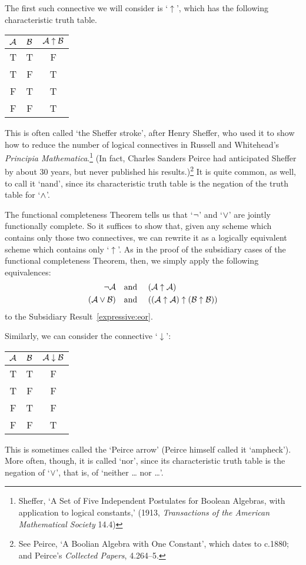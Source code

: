 The first such connective we will consider is `$\uparrow$', which has the following characteristic truth table. 
\begin{center}
\begin{tabular}{c c | c}
$\mathcal{A}$ & $\mathcal{B}$ & $\mathcal{A} \mathrel{\uparrow} \mathcal{B}$\\
\hline
 T & T & F \\
 T & F & T \\
 F & T & T  \\
 F & F & T
\end{tabular}
\end{center}
 This is often called `the Sheffer stroke', after Henry Sheffer, who used it to show how to reduce the number of logical connectives in Russell and Whitehead's \emph{Principia Mathematica}.\footnote{Sheffer, `A Set of Five Independent Postulates for Boolean Algebras, with application to logical constants,' (1913, \emph{Transactions of the American Mathematical Society} 14.4)} (In fact, Charles Sanders Peirce had anticipated Sheffer by about 30 years, but never published his results.)\footnote{See Peirce, `A Boolian Algebra with One Constant', which dates to c.1880; and Peirce's \emph{Collected Papers}, 4.264--5.} It is quite common, as well, to call it `nand', since its characteristic truth table is the negation of the truth table for `$\wedge$'.

The functional completeness Theorem tells us that `$\neg$' and `$\vee$' are jointly functionally complete. So it suffices to show that, given any scheme which contains only those two connectives, we can rewrite it as a logically equivalent scheme which contains only `$\uparrow$'. As in the proof of the subsidiary cases of the functional completeness Theorem, then, we simply apply the following equivalences:
		\begin{align*}
			\neg \mathcal{A} &\text{\quad and \quad} (\mathcal{A} \uparrow \mathcal{A})\\
			(\mathcal{A} \vee \mathcal{B}) & \text{\quad and \quad} ((\mathcal{A} \uparrow \mathcal{A}) \uparrow (\mathcal{B} \uparrow \mathcal{B}))
		\end{align*}
to the Subsidiary Result~\ref{expressive:eor}.

Similarly, we can consider the connective `$\downarrow$':
\begin{center}
\begin{tabular}{c c | c}
$\mathcal{A}$ & $\mathcal{B}$ & $\mathcal{A} \mathrel{\downarrow} \mathcal{B}$\\
\hline
 T & T & F \\
 T & F & F  \\
 F & T & F  \\
 F & F & T
\end{tabular}
\end{center}
This is sometimes called the `Peirce arrow' (Peirce himself called it `ampheck'). More often, though, it is called `nor', since its characteristic truth table is the negation of `$\vee$', that is, of `neither \dots{} nor \dots'.

